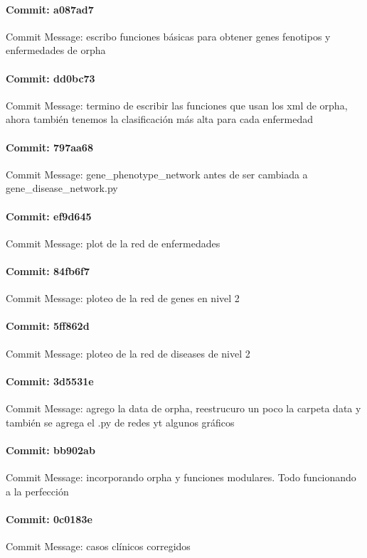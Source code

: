 \documentclass{article}
\begin{document}
\paragraph{Commit: a087ad7}
Commit Message: escribo funciones básicas para obtener genes fenotipos y enfermedades de orpha

\paragraph{Commit: dd0bc73}
Commit Message: termino de escribir las funciones que usan los xml de orpha, ahora también tenemos la clasificación más alta para cada enfermedad

\paragraph{Commit: 797aa68}
Commit Message: gene_phenotype_network antes de ser cambiada a gene_disease_network.py

\paragraph{Commit: ef9d645}
Commit Message: plot de la red de enfermedades

\paragraph{Commit: 84fb6f7}
Commit Message: ploteo de la red de genes en nivel 2

\paragraph{Commit: 5ff862d}
Commit Message: ploteo de la red de diseases de nivel 2

\paragraph{Commit: 3d5531e}
Commit Message: agrego la data de orpha, reestrucuro un poco la carpeta data y también se agrega el .py de redes yt algunos gráficos

\paragraph{Commit: bb902ab}
Commit Message: incorporando orpha y funciones modulares. Todo funcionando a la perfección

\paragraph{Commit: 0c0183e}
Commit Message: casos clínicos corregidos
\end{document}

